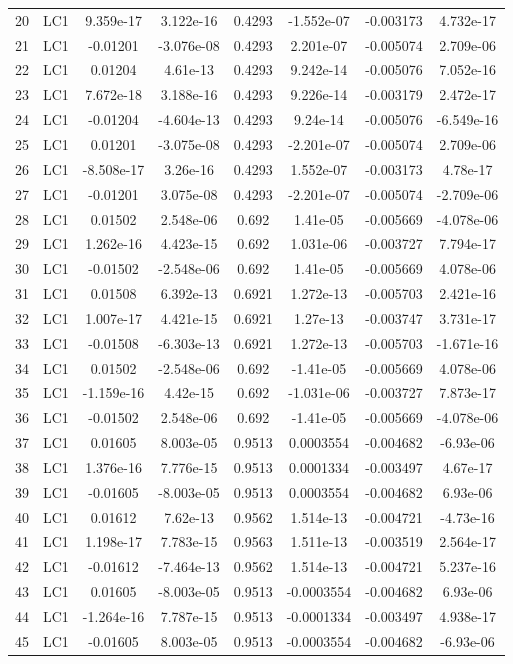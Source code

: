 \documentclass{article}%
\begin{document}
\begin{longtable}{| c c | c c c c c c |}
20&LC1&9.359e{-}17&3.122e{-}16&0.4293&{-}1.552e{-}07&{-}0.003173&4.732e{-}17\\%
21&LC1&{-}0.01201&{-}3.076e{-}08&0.4293&2.201e{-}07&{-}0.005074&2.709e{-}06\\%
22&LC1&0.01204&4.61e{-}13&0.4293&9.242e{-}14&{-}0.005076&7.052e{-}16\\%
23&LC1&7.672e{-}18&3.188e{-}16&0.4293&9.226e{-}14&{-}0.003179&2.472e{-}17\\%
24&LC1&{-}0.01204&{-}4.604e{-}13&0.4293&9.24e{-}14&{-}0.005076&{-}6.549e{-}16\\%
25&LC1&0.01201&{-}3.075e{-}08&0.4293&{-}2.201e{-}07&{-}0.005074&2.709e{-}06\\%
26&LC1&{-}8.508e{-}17&3.26e{-}16&0.4293&1.552e{-}07&{-}0.003173&4.78e{-}17\\%
27&LC1&{-}0.01201&3.075e{-}08&0.4293&{-}2.201e{-}07&{-}0.005074&{-}2.709e{-}06\\%
28&LC1&0.01502&2.548e{-}06&0.692&1.41e{-}05&{-}0.005669&{-}4.078e{-}06\\%
29&LC1&1.262e{-}16&4.423e{-}15&0.692&1.031e{-}06&{-}0.003727&7.794e{-}17\\%
30&LC1&{-}0.01502&{-}2.548e{-}06&0.692&1.41e{-}05&{-}0.005669&4.078e{-}06\\%
31&LC1&0.01508&6.392e{-}13&0.6921&1.272e{-}13&{-}0.005703&2.421e{-}16\\%
32&LC1&1.007e{-}17&4.421e{-}15&0.6921&1.27e{-}13&{-}0.003747&3.731e{-}17\\%
33&LC1&{-}0.01508&{-}6.303e{-}13&0.6921&1.272e{-}13&{-}0.005703&{-}1.671e{-}16\\%
34&LC1&0.01502&{-}2.548e{-}06&0.692&{-}1.41e{-}05&{-}0.005669&4.078e{-}06\\%
35&LC1&{-}1.159e{-}16&4.42e{-}15&0.692&{-}1.031e{-}06&{-}0.003727&7.873e{-}17\\%
36&LC1&{-}0.01502&2.548e{-}06&0.692&{-}1.41e{-}05&{-}0.005669&{-}4.078e{-}06\\%
37&LC1&0.01605&8.003e{-}05&0.9513&0.0003554&{-}0.004682&{-}6.93e{-}06\\%
38&LC1&1.376e{-}16&7.776e{-}15&0.9513&0.0001334&{-}0.003497&4.67e{-}17\\%
39&LC1&{-}0.01605&{-}8.003e{-}05&0.9513&0.0003554&{-}0.004682&6.93e{-}06\\%
40&LC1&0.01612&7.62e{-}13&0.9562&1.514e{-}13&{-}0.004721&{-}4.73e{-}16\\%
41&LC1&1.198e{-}17&7.783e{-}15&0.9563&1.511e{-}13&{-}0.003519&2.564e{-}17\\%
42&LC1&{-}0.01612&{-}7.464e{-}13&0.9562&1.514e{-}13&{-}0.004721&5.237e{-}16\\%
43&LC1&0.01605&{-}8.003e{-}05&0.9513&{-}0.0003554&{-}0.004682&6.93e{-}06\\%
44&LC1&{-}1.264e{-}16&7.787e{-}15&0.9513&{-}0.0001334&{-}0.003497&4.938e{-}17\\%
45&LC1&{-}0.01605&8.003e{-}05&0.9513&{-}0.0003554&{-}0.004682&{-}6.93e{-}06\\%
\end{longtable}%
\end{document}
